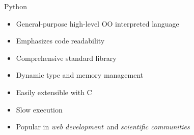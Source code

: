 \documentclass[utf8x,xcolor=pdftex,dvipsnames,table]{beamer}
\begin{document}



\begin{frame}{Python}
  \begin{itemize}
  \item General-purpose high-level OO interpreted language
  \item Emphasizes code readability
  \item Comprehensive standard library
  \item Dynamic type and memory management
  \item Easily extensible with C
  \item Slow execution
  \item Popular in {\em web development}\ and {\em scientific communities}
  \end{itemize}
\end{frame}
\end{document}
